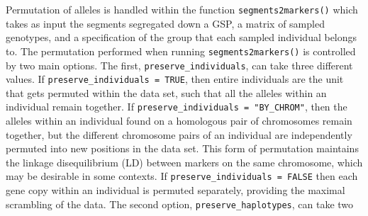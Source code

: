 Permutation of alleles is handled within the \gscramble{} function {\footnotesize\tt segments2markers()}
which takes as input the segments segregated down a GSP, a matrix of sampled genotypes, and a specification
of the group that each sampled individual belongs to.  The permutation performed when running
{\footnotesize\tt segments2markers()} is controlled by two main options.  The first, {\tt\footnotesize preserve\_individuals},
can take three different values.  If {\tt\footnotesize preserve\_individuals = TRUE}, then entire individuals are the unit that gets permuted within the
data set,
such that all the alleles within an individual remain together.  If {\tt\footnotesize preserve\_individuals = "BY\_CHROM"}, then
the alleles within an individual found on a homologous pair of chromosomes remain together, but the different
chromosome pairs of an individual are independently permuted into new positions in the data set.  This form of permutation
maintains the linkage disequilibrium (LD) between markers on the same chromosome, which may be desirable in some contexts.
If {\tt\footnotesize preserve\_individuals = FALSE} then each gene copy within an individual is permuted separately,
providing the maximal scrambling of the data. The second option, {\tt\footnotesize preserve\_haplotypes}, can take two
